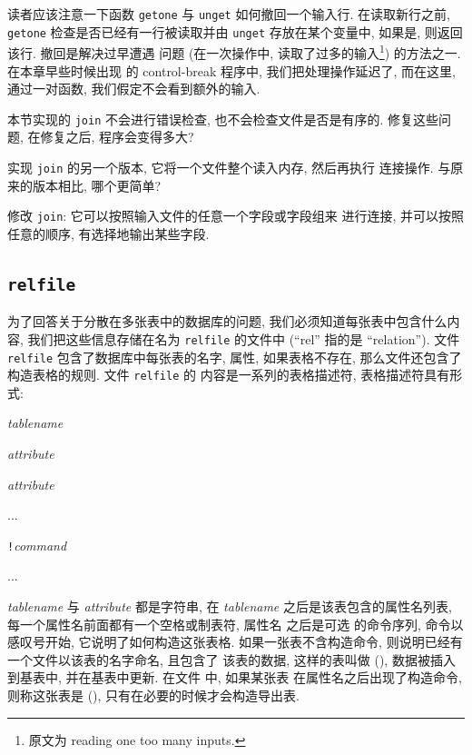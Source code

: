 读者应该注意一下函数 \texttt{getone} 与 \texttt{unget} 如何撤回一个输入行.
在读取新行之前, \texttt{getone} 检查是否已经有一行被读取并由
\texttt{unget} 存放在某个变量中, 如果是, 则返回该行. 撤回是解决过早遭遇
问题 (在一次操作中, 读取了过多的输入\footnote{原文为 reading one too 
many inputs.}) 的方法之一.
在本章早些时候出现 的 control-break 程序中, 我们把处理操作延迟了, 而在这里,
通过一对函数, 我们假定不会看到额外的输入.

\begin{exercise}
    \label{exer:join}
    本节实现的 \texttt{join} 不会进行错误检查, 也不会检查文件是否是有序的.
    修复这些问题, 在修复之后, 程序会变得多大?
\end{exercise}

\begin{exercise}
    实现 \texttt{join} 的另一个版本, 它将一个文件整个读入内存, 然后再执行 
    连接操作. 与原来的版本相比, 哪个更简单?
\end{exercise}

\begin{exercise}
    修改 \texttt{join}: 它可以按照输入文件的任意一个字段或字段组来
    进行连接, 并可以按照任意的顺序, 有选择地输出某些字段.
\end{exercise}

\subsection{\texttt{relfile}}
为了回答关于分散在多张表中的数据库的问题, 我们必须知道每张表中包含什么内容,
我们把这些信息存储在名为 \texttt{relfile} 的文件中 (``rel'' 指的是
``relation''). 文件 \texttt{relfile} 包含了数据库中每张表的名字, 属性,
如果表格不存在, 那么文件还包含了构造表格的规则. 文件 \texttt{relfile} 的
内容是一系列的表格描述符, 表格描述符具有形式:
\begin{pattern}
    \indent\textit{tablename} \par 
    \indent\indent\textit{attribute} \par 
    \indent\indent\textit{attribute} \par 
    \indent\indent\indent ...   \par
    \indent\indent\texttt{!}\textit{command} \par
    \indent\indent\indent ...
\end{pattern}
\textit{tablename} 与 \textit{attribute} 都是字符串, 在 \textit{tablename} 
之后是该表包含的属性名列表, 每一个属性名前面都有一个空格或制表符, 属性名
之后是可选 的命令序列, 命令以感叹号开始, 它说明了如何构造这张表格.
如果一张表不含构造命令, 则说明已经有一个文件以该表的名字命名, 且包含了
该表的数据, 这样的表叫做  (), 数据被插入
到基表中, 并在基表中更新. 在文件  中, 如果某张表
在属性名之后出现了构造命令, 则称这张表是  (), 只有在必要的时候才会构造导出表.

